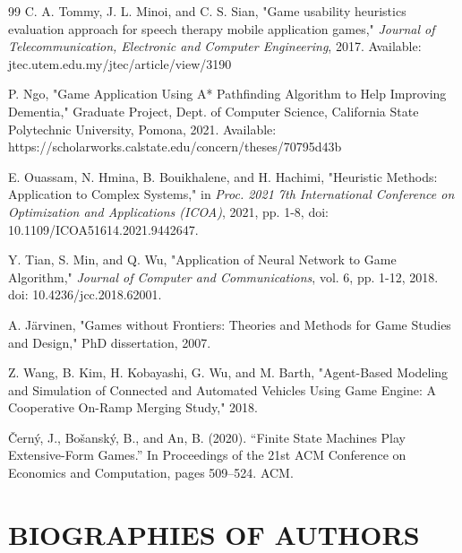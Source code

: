 \documentclass{telkomnika}
\begin{document}
\begin{thebibliography} {99}
C. A. Tommy, J. L. Minoi, and C. S. Sian, "Game usability heuristics evaluation approach for speech therapy mobile application games," \textit{Journal of Telecommunication, Electronic and Computer Engineering}, 2017. Available: jtec.utem.edu.my/jtec/article/view/3190

P. Ngo, "Game Application Using A* Pathfinding Algorithm to Help Improving Dementia," Graduate Project, Dept. of Computer Science, California State Polytechnic University, Pomona, 2021. Available: https://scholarworks.calstate.edu/concern/theses/70795d43b

E. Ouassam, N. Hmina, B. Bouikhalene, and H. Hachimi, "Heuristic Methods: Application to Complex Systems," in \textit{Proc. 2021 7th International Conference on Optimization and Applications (ICOA)}, 2021, pp. 1-8, doi: 10.1109/ICOA51614.2021.9442647.

Y. Tian, S. Min, and Q. Wu, "Application of Neural Network to Game Algorithm," \textit{Journal of Computer and Communications}, vol. 6, pp. 1-12, 2018. doi: 10.4236/jcc.2018.62001.


A. Järvinen, "Games without Frontiers: Theories and Methods for Game Studies and Design," PhD dissertation, 2007.

Z. Wang, B. Kim, H. Kobayashi, G. Wu, and M. Barth, "Agent-Based Modeling and Simulation of Connected and Automated Vehicles Using Game Engine: A Cooperative On-Ramp Merging Study," 2018.

Černý, J., Bošanský, B., and An, B. (2020). ``Finite State Machines Play Extensive-Form Games.'' In Proceedings of the 21st ACM Conference on Economics and Computation, pages 509--524. ACM.


\end{thebibliography}

\newpage

\section*{BIOGRAPHIES OF AUTHORS} 
\end{document}

